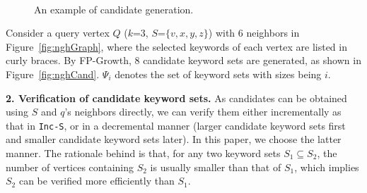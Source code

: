\begin{figure}[ht]
    \centering
    \mbox{
        \hspace{1ex}
    }
    \caption{An example of candidate generation.}
\end{figure}
\begin{example}
Consider a query vertex $Q$ ($k$=3, $S$=$\{v,x,y,z\}$) with 6 neighbors in Figure~\ref{fig:nghGraph},
where the selected keywords of each vertex are listed in curly braces.
By FP-Growth, 8 candidate keyword sets are generated, as shown in Figure~\ref{fig:nghCand}.
$\Psi_i$ denotes the set of keyword sets with sizes being $i$.
\end{example}

\textbf{2. Verification of candidate keyword sets.}
As candidates can be obtained using $S$ and $q$'s neighbors directly,
we can verify them either incrementally as that in {\tt Inc-S},
or in a decremental manner (larger candidate keyword sets first and smaller candidate keyword sets later).
In this paper, we choose the latter manner. The rationale behind is that,
for any two keyword sets $S_1\subseteq S_2$, the number of vertices containing $S_2$ is usually smaller than that of $S_1$,
which implies $S_2$ can be verified more efficiently than $S_1$.


